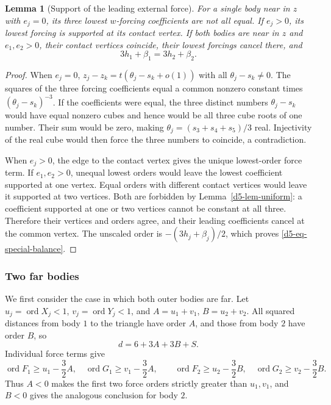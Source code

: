 \documentclass[Threeside,11pt]{article}
\newtheorem{lemma}[theorem]{Lemma}
\theoremstyle{definition}
\theoremstyle{remark}
\numberwithin{equation}{section}
\theoremstyle{remark}
\newcommand{\ord}{\operatorname{ord}}
\begin{document}
{\begin{lemma}[Support of the leading external force]\label{d5-lem-support}
For a single body near in $z$ with $e_j=0$, its three lowest $w$-forcing coefficients
are not all equal. If $e_j>0$, its lowest forcing is supported at its contact
vertex. If both bodies are near in $z$ and $e_1,e_2>0$, their contact vertices
coincide, their lowest forcings cancel there, and
\begin{equation}\label{d5-eq-special-balance}
 3h_1+\beta_1=3h_2+\beta_2.
\end{equation}
\end{lemma}
\begin{proof}
When $e_j=0$,
$z_j-z_k=t(\theta_j-s_k+o(1))$ with all $\theta_j-s_k\ne0$.
The squares of the three forcing coefficients equal a common nonzero constant times
$(\theta_j-s_k)^{-3}$.  If the coefficients were equal, the three distinct
numbers $\theta_j-s_k$ would have equal nonzero cubes and hence would be all
three cube roots of one number.  Their sum would be zero, making
$\theta_j=(s_3+s_4+s_5)/3$ real.  Injectivity of the real cube would then force
the three numbers to coincide, a contradiction.

When $e_j>0$, the edge to the contact vertex gives the unique lowest-order
force term. If $e_1,e_2>0$, unequal lowest orders would leave the lowest coefficient
supported at one vertex. Equal orders with different contact vertices would
leave it supported at two vertices.  Both are forbidden by
Lemma~\ref{d5-lem-uniform}: a coefficient supported at one or two vertices
cannot be constant at all three.  Therefore their vertices and orders agree,
and their leading coefficients cancel at the common vertex.  The unscaled order is
$-(3h_j+\beta_j)/2$, which proves \eqref{d5-eq-special-balance}.
\end{proof}

\subsubsection{Two far bodies}\label{d5-far-far}
We first consider the case in which both outer bodies are far.
Let $u_j=\ord X_j<1$, $v_j=\ord Y_j<1$, and
$A=u_1+v_1$, $B=u_2+v_2$.  All squared distances from body $1$ to the triangle have order
$A$, and those from body $2$ have order $B$, so
\begin{equation}\label{d5-eq-far-product}
 d=6+3A+3B+S.
\end{equation}
Individual force terms give
\[
 \ord F_1\ge u_1-\frac32A,\quad \ord G_1\ge v_1-\frac32A,
 \qquad
 \ord F_2\ge u_2-\frac32B,\quad \ord G_2\ge v_2-\frac32B.
\]
Thus $A<0$ makes the first two force orders strictly greater than $u_1,v_1$,
and $B<0$ gives the analogous conclusion for body $2$.

}
\end{document}
